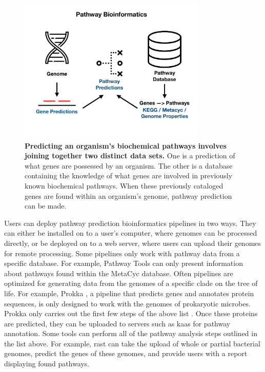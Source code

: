 \begin{figure}[!ht]
  \centering
	\includegraphics[width=0.8\textwidth]{media/pathway_bioinformatics.pdf}
	 \caption[Predicting an organism's biochemical pathways involves joining 
together two distinct data sets.]{\textbf{Predicting an organism's biochemical 
pathways involves joining together two distinct data sets.} One is a prediction 
of what genes are possessed by an organism. The other is a database containing 
the knowledge of what genes are involved in previously known biochemical 
pathways. When these previously cataloged genes are found within an organism's 
genome, pathway prediction can be made.}
	 \label{fig:pathway-analysis-overview}
\end{figure}

Users can deploy pathway prediction bioinformatics pipelines in two ways. They 
can either be installed on to a user's computer, where genomes can be processed 
directly, or be deployed on to a web server, where users can upload their 
genomes for remote processing. Some pipelines only work with pathway data from a 
specific database. For example, Pathway Tools \cite{karp2002pathway} can only 
present information about pathways found within the MetaCyc 
\cite{karp2002metacyc} database. Often pipelines are optimized for generating 
data from the genomes of a specific clade on the tree of life. For example, 
Prokka \cite{seemann2014prokka}, a pipeline that predicts genes and annotates 
protein sequences, is only designed to work with the genomes of prokaryotic 
microbes. Prokka only carries out the first few steps of the above list 
\cite{seemann2014prokka}. Once these proteins are predicted, they can be 
uploaded to servers such as \gls{kaas} \cite{moriya2007kaas} for pathway 
annotation. Some tools can perform all of the pathway analysis steps outlined in 
the list above. For example, \gls{rast} \cite{aziz2008rast} can take the upload 
of whole or partial bacterial genomes, predict the genes of these genomes, and 
provide users with a report displaying found pathways.

